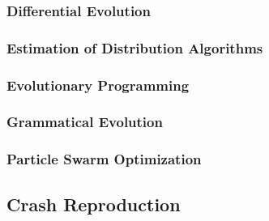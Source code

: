       \subsubsection{Differential Evolution}
      \subsubsection{Estimation of Distribution Algorithms}
      \subsubsection{Evolutionary Programming}
      \subsubsection{Grammatical Evolution}
      \subsubsection{Particle Swarm Optimization}
    \subsection{Crash Reproduction}
    \label{sec:future:beacon}
      \Blindtext
